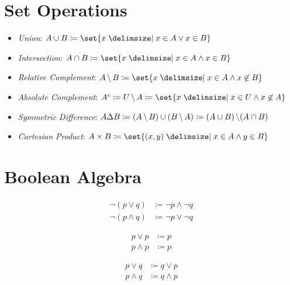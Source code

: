 \section{Set Operations}
\begin{itemize}
    \item \textit{Union}: $A \cup B \coloneqq \set{x \given x \in A \lor x \in B}$
    \item \textit{Intersection}: $A \cap B \coloneqq \set{x \given x \in A \land x \in B}$
    \item \textit{Relative Complement}: $A \Diff B \coloneqq \set{x \given x \in A \land x \not\in B}$
    \item \textit{Absolute Complement}: $\AbsComplement{A} \coloneqq U \Diff A \coloneqq \set{x \given x \in U \land x \not\in A}$
    \item \textit{Symmetric Difference}: $A \Delta B \coloneqq (A \operatorname{\backslash} B) \cup (B \operatorname{\backslash} A) \coloneqq (A \cup B)\operatorname{\backslash}(A \cap B)$
    \item \textit{Cartesian Product}: $A \times B \coloneqq \set{(x, y) \given x \in A \land y \in B}$
\end{itemize}

\section{Boolean Algebra}
\begin{definition}
\begin{align}
    \neg (p \lor q ) &\coloneqq \neg p \land \neg q \\
    \neg (p \land q) &\coloneqq \neg p \lor \neg q 
\end{align}
\end{definition}

\begin{definition}
\begin{align}
    p \lor p &\coloneqq p \\
    p \land p &\coloneqq p
\end{align}

\end{definition}

\begin{definition}
\begin{align}
    p \lor q &\coloneqq q \lor p \\
    p \land q &\coloneqq q \land p
\end{align}
\end{definition}

